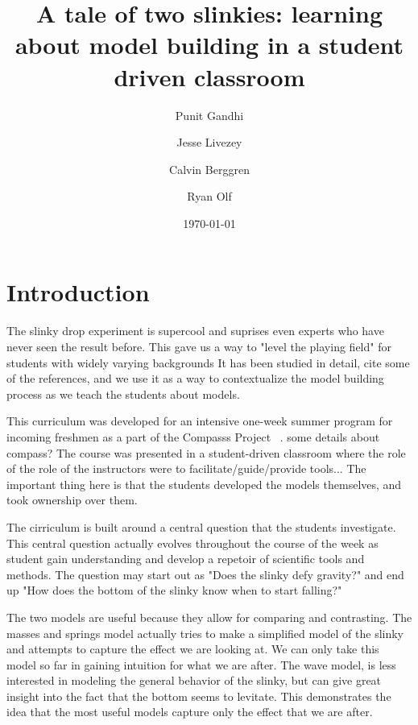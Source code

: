 \documentclass[aps,pre,10pt,superscriptaddress,showpacs,amsmath,amssymb,nofootinbib]{revtex4-1}
\begin{document}
\title{A tale of two slinkies: learning about model building in a student driven classroom }
\author{Punit  Gandhi}
\author{Jesse Livezey}
\author{Calvin Berggren}
\author{Ryan Olf}
\date{\today}

\begin{abstract}

\end{abstract}

\maketitle

\section{Introduction}
The slinky drop experiment is supercool and suprises even experts who have never seen the result before.  This gave us a way to "level the playing field" for students with widely varying backgrounds    It has been studied in detail, cite some of the references, and we use it as a way to contextualize the model building process as we teach the students about models. 

This curriculum was developed for an intensive one-week summer program for incoming freshmen as a part of the Compasss Project ~\cite{albana2013}. some details about compass?  The course was presented in a student-driven classroom where the role of the role of the instructors were to facilitate/guide/provide tools...  The important thing here is that the students developed the models themselves, and took ownership over them.  

The cirriculum is built around a central question that the students investigate.  This central question actually evolves throughout the course of the week as student gain understanding and develop a repetoir of scientific tools and methods.  The question may start out as "Does the slinky defy gravity?" and end up  "How does the bottom of the slinky know when to start falling?" 

The two models are useful because they allow for comparing and contrasting. The masses and springs model actually tries to make a simplified model of the slinky and attempts to capture the effect we are looking at.  We can only take this model so far in gaining intuition for what we are after.    The wave model, is less interested in modeling the general behavior of the slinky, but can give great insight into the fact that the bottom seems to levitate.  This demonstrates the idea that the most useful  models  capture only the effect that we are after. 
\end{document}
